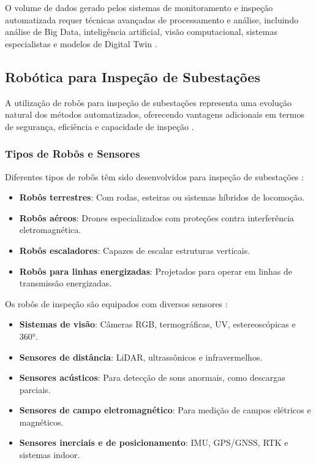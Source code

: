 O volume de dados gerado pelos sistemas de monitoramento e inspeção automatizada requer técnicas avançadas de processamento e análise, incluindo análise de Big Data, inteligência artificial, visão computacional, sistemas especialistas e modelos de Digital Twin \cite{Clouglobal2024}.

\subsection{Robótica para Inspeção de Subestações}

A utilização de robôs para inspeção de subestações representa uma evolução natural dos métodos automatizados, oferecendo vantagens adicionais em termos de segurança, eficiência e capacidade de inspeção \cite{Lactec2022}.

\subsubsection{Tipos de Robôs e Sensores}

Diferentes tipos de robôs têm sido desenvolvidos para inspeção de subestações \cite{GlobalGrowthInsights2024}:

\begin{itemize}
    \item \textbf{Robôs terrestres}: Com rodas, esteiras ou sistemas híbridos de locomoção.
    \item \textbf{Robôs aéreos}: Drones especializados com proteções contra interferência eletromagnética.
    \item \textbf{Robôs escaladores}: Capazes de escalar estruturas verticais.
    \item \textbf{Robôs para linhas energizadas}: Projetados para operar em linhas de transmissão energizadas.
\end{itemize}

Os robôs de inspeção são equipados com diversos sensores \cite{Lactec2022, Iberdrola2022}:

\begin{itemize}
    \item \textbf{Sistemas de visão}: Câmeras RGB, termográficas, UV, estereoscópicas e 360°.
    \item \textbf{Sensores de distância}: LiDAR, ultrassônicos e infravermelhos.
    \item \textbf{Sensores acústicos}: Para detecção de sons anormais, como descargas parciais.
    \item \textbf{Sensores de campo eletromagnético}: Para medição de campos elétricos e magnéticos.
    \item \textbf{Sensores inerciais e de posicionamento}: IMU, GPS/GNSS, RTK e sistemas indoor.
\end{itemize}

